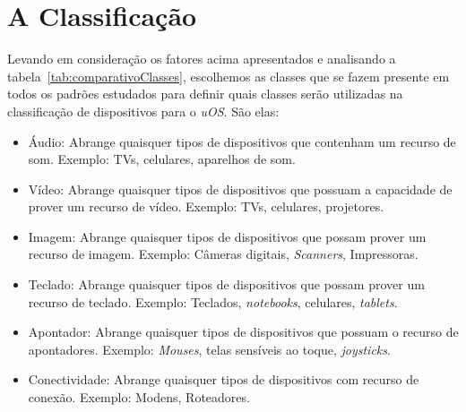\section{A Classificação}
Levando em consideração os fatores acima apresentados e analisando a tabela~\ref{tab:comparativoClasses}, escolhemos as classes que se fazem presente em todos os padrões estudados para definir quais classes serão utilizadas na classificação de dispositivos para o \emph{uOS}. São elas:

\begin{itemize}
	\item Áudio:
		Abrange quaisquer tipos de dispositivos que contenham um recurso de som. Exemplo: TVs, celulares, aparelhos de som.
	\item Vídeo:
		Abrange quaisquer tipos de dispositivos que possuam a capacidade de prover um recurso de vídeo. Exemplo: TVs, celulares, projetores.
	\item Imagem:
		Abrange quaisquer tipos de dispositivos que possam prover um recurso de imagem. Exemplo: Câmeras digitais, \emph{Scanners}, Impressoras.
	\item Teclado:
		Abrange quaisquer tipos de dispositivos que possam prover um recurso de teclado. Exemplo: Teclados, \emph{notebooks}, celulares, \emph{tablets}.
	\item Apontador:
		Abrange quaisquer tipos de dispositivos que possuam o recurso de apontadores. Exemplo: \emph{Mouses}, telas sensíveis ao toque, \emph{joysticks}.
	\item Conectividade:
		Abrange quaisquer tipos de dispositivos com recurso de conexão. Exemplo: Modens, Roteadores.
\end{itemize}


